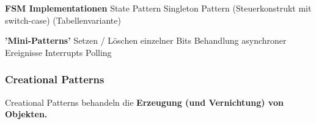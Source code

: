 \begin{minipage}[t]{0.48\columnwidth}
    \raggedright

    \begin{outline}
        \1 \textbf{FSM Implementationen}
            \2 State Pattern
            \2 Singleton Pattern
            \2 (Steuerkonstrukt mit switch-case)
            \2 (Tabellenvariante)
    \end{outline}
\end{minipage}
\hfill
\begin{minipage}[t]{0.5\columnwidth}
    \raggedright
    
    \begin{outline}
        \1 \textbf{'Mini-Patterns'}
            \2 Setzen / Löschen einzelner Bits
            \2 Behandlung asynchroner Ereignisse
                \3 Interrupts
                \3 Polling
    \end{outline}
\end{minipage}


\subsubsection{Creational Patterns}

Creational Patterns behandeln die \textbf{Erzeugung (und Vernichtung) von Objekten.}

\vspace{0.1cm}


    


